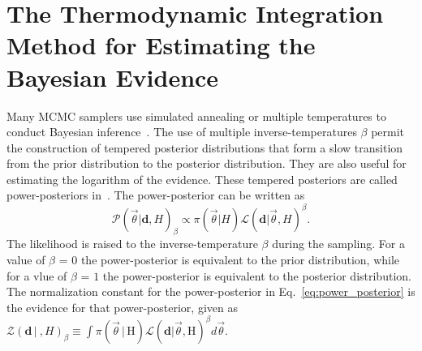 \section{The Thermodynamic Integration Method for Estimating the Bayesian Evidence}
Many MCMC samplers use simulated annealing or multiple temperatures to conduct Bayesian inference~\citep{emcee, vousden:2016, doi:10.1143/PTPS.157.317, B509983H}. The use of multiple inverse-temperatures $\beta$ permit the construction of tempered posterior distributions that form a slow transition from the prior distribution to the posterior distribution. They are also useful for estimating the logarithm of the evidence. These tempered posteriors are called power-posteriors in~\cite{lartillot2006computing, friel2008marginal}. The power-posterior can be written as
\begin{equation}
    \mathcal{P}\left(\vec{\theta}|\mathbf{d}, H\right)_\beta \propto \pi\left(\vec{\theta} | H\right) \mathcal{L}\left(\mathbf{d} | \vec{\theta}, H\right)^\beta.
\end{equation}\label{eq:power_posterior}
The likelihood is raised to the inverse-temperature $\beta$ during the sampling. For a value of $\beta$ = $0$ the power-posterior is equivalent to the prior distribution, while for a vlue of $\beta$ = $1$ the power-posterior is equivalent to the posterior distribution. The normalization constant for the power-posterior in Eq.~\ref{eq:power_posterior} is the evidence for that power-posterior, given as $\mathcal{Z}(\mathbf{d} \, | \ ,H)_\beta \equiv \int \pi\left(\vec{\theta} \, | \, \mathrm{H}\right) \mathcal{L}\left(\mathbf{d} | \vec{\theta}, \mathrm{H}\right)^\beta d\vec{\theta}$.

